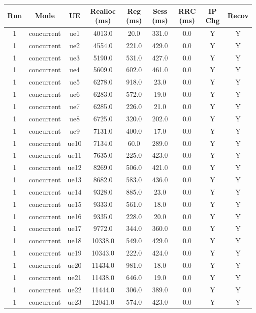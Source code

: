 \begin{table}[ht]
\centering
\begin{tabular}{|c|c|c|c|c|c|c|c|c|}
\hline
Run & Mode & UE & Realloc (ms) & Reg (ms) & Sess (ms) & RRC (ms) & IP Chg & Recov \\
\hline
1 & concurrent & ue1 & 4013.0 & 20.0 & 331.0 & 0.0 & Y & Y \\
1 & concurrent & ue2 & 4554.0 & 221.0 & 429.0 & 0.0 & Y & Y \\
1 & concurrent & ue3 & 5190.0 & 531.0 & 427.0 & 0.0 & Y & Y \\
1 & concurrent & ue4 & 5609.0 & 602.0 & 461.0 & 0.0 & Y & Y \\
1 & concurrent & ue5 & 6278.0 & 918.0 & 23.0 & 0.0 & Y & Y \\
1 & concurrent & ue6 & 6283.0 & 572.0 & 19.0 & 0.0 & Y & Y \\
1 & concurrent & ue7 & 6285.0 & 226.0 & 21.0 & 0.0 & Y & Y \\
1 & concurrent & ue8 & 6725.0 & 320.0 & 202.0 & 0.0 & Y & Y \\
1 & concurrent & ue9 & 7131.0 & 400.0 & 17.0 & 0.0 & Y & Y \\
1 & concurrent & ue10 & 7134.0 & 60.0 & 289.0 & 0.0 & Y & Y \\
1 & concurrent & ue11 & 7635.0 & 225.0 & 423.0 & 0.0 & Y & Y \\
1 & concurrent & ue12 & 8269.0 & 506.0 & 421.0 & 0.0 & Y & Y \\
1 & concurrent & ue13 & 8682.0 & 583.0 & 436.0 & 0.0 & Y & Y \\
1 & concurrent & ue14 & 9328.0 & 885.0 & 23.0 & 0.0 & Y & Y \\
1 & concurrent & ue15 & 9333.0 & 561.0 & 18.0 & 0.0 & Y & Y \\
1 & concurrent & ue16 & 9335.0 & 228.0 & 20.0 & 0.0 & Y & Y \\
1 & concurrent & ue17 & 9772.0 & 344.0 & 360.0 & 0.0 & Y & Y \\
1 & concurrent & ue18 & 10338.0 & 549.0 & 429.0 & 0.0 & Y & Y \\
1 & concurrent & ue19 & 10343.0 & 222.0 & 424.0 & 0.0 & Y & Y \\
1 & concurrent & ue20 & 11434.0 & 981.0 & 18.0 & 0.0 & Y & Y \\
1 & concurrent & ue21 & 11438.0 & 646.0 & 19.0 & 0.0 & Y & Y \\
1 & concurrent & ue22 & 11444.0 & 306.0 & 389.0 & 0.0 & Y & Y \\
1 & concurrent & ue23 & 12041.0 & 574.0 & 423.0 & 0.0 & Y & Y \\

\end{tabular}
\end{table}
